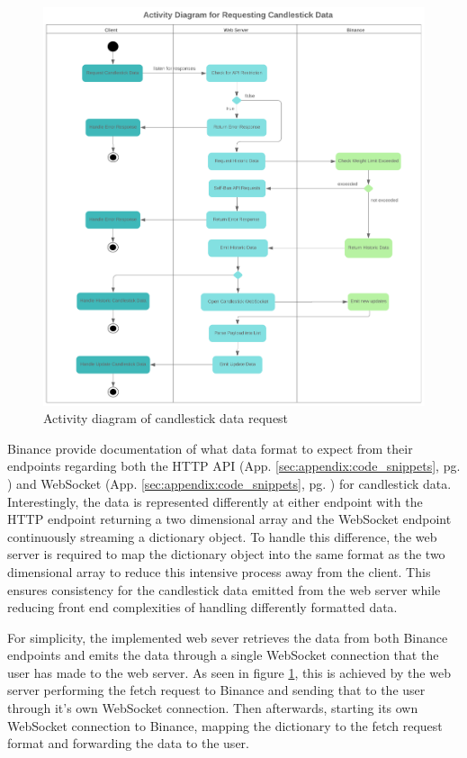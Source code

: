 \begin{figure}[!htb]
    \centering
	\includegraphics[width=\textwidth]{content/graphics/diagrams/AD_KLINE.png}
	\caption{Activity diagram of candlestick data request}
    
	\label{fig:implementation:AD_KLINE}
\end{figure}

Binance provide documentation of what data format to expect from their endpoints regarding both the HTTP API (App. \ref{sec:appendix:code_snippets}, pg. \pageref{code:impl:info_comm:bin_exch:api_format}) and WebSocket (App. \ref{sec:appendix:code_snippets}, pg. \pageref{code:impl:info_comm:bin_exch:ws_format}) for candlestick data. Interestingly, the data is represented differently at either endpoint with the HTTP endpoint returning a two dimensional array and the WebSocket endpoint continuously streaming a dictionary object. To handle this difference, the web server is required to map the dictionary object into the same format as the two dimensional array to reduce this intensive process away from the client. This ensures consistency for the candlestick data emitted from the web server while reducing front end complexities of handling differently formatted data.

For simplicity, the implemented web sever retrieves the data from both Binance endpoints and emits the data through a single WebSocket connection that the user has made to the web server. As seen in figure \ref{fig:implementation:AD_KLINE}, this is achieved by the web server performing the fetch request to Binance and sending that to the user through it's own WebSocket connection. Then afterwards, starting its own WebSocket connection to Binance, mapping the dictionary to the fetch request format and forwarding the data to the user. 

